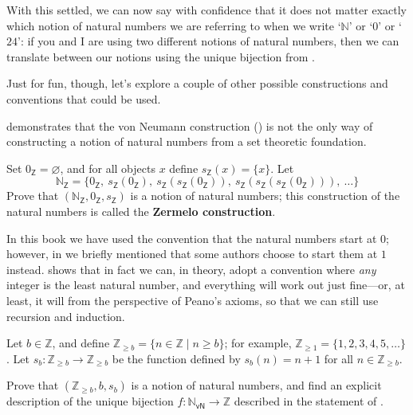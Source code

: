 With this settled, we can now say with confidence that it does not matter exactly which notion of natural numbers we are referring to when we write `$\mathbb{N}$' or `$0$' or `$24$': if you and I are using two different notions of natural numbers, then we can translate between our notions using the unique bijection from .

Just for fun, though, let's explore a couple of other possible constructions and conventions that could be used.

 demonstrates that the von Neumann construction () is not the only way of constructing a notion of natural numbers from a set theoretic foundation.

\begin{exercise}
\label{exZermeloNaturalNumbers}
Set $0_{\mathsf{Z}} = \varnothing$, and for all objects $x$ define $s_{\mathsf{Z}}(x) = \{ x \}$. Let
\[ \mathbb{N}_{\mathsf{Z}} = \{ 0_{\mathsf{Z}},~ s_{\mathsf{Z}}(0_{\mathsf{Z}}),~ s_{\mathsf{Z}}(s_{\mathsf{Z}}(0_{\mathsf{Z}})),~ s_{\mathsf{Z}}(s_{\mathsf{Z}}(s_{\mathsf{Z}}(0_{\mathsf{Z}}))) ,~ \dots \} \]
Prove that $(\mathbb{N}_{\mathsf{Z}}, 0_{\mathsf{Z}}, s_{\mathsf{Z}})$ is a notion of natural numbers; this construction of the natural numbers is called the \textbf{Zermelo construction}.
\end{exercise}

In this book we have used the convention that the natural numbers start at $0$; however, in  we briefly mentioned that some authors choose to start them at $1$ instead.  shows that in fact we can, in theory, adopt a convention where \textit{any} integer is the least natural number, and everything will work out just fine---or, at least, it will from the perspective of Peano's axioms, so that we can still use recursion and induction.

\begin{exercise}
\label{exNaturalNumbersArbitraryBase}
Let $b \in \mathbb{Z}$, and define $\mathbb{Z}_{\ge b} = \{ n \in \mathbb{Z} \mid n \ge b \}$; for example, $\mathbb{Z}_{\ge 1} = \{ 1, 2, 3, 4, 5, \dots \}$. Let $s_b : \mathbb{Z}_{\ge b} \to \mathbb{Z}_{\ge b}$ be the function defined by $s_b(n) = n+1$ for all $n \in \mathbb{Z}_{\ge b}$.

Prove that $(\mathbb{Z}_{\ge b}, b, s_b)$ is a notion of natural numbers, and find an explicit description of the unique bijection $f : \mathbb{N}_{\mathsf{vN}} \to \mathbb{Z}$ described in the statement of .
\end{exercise}


